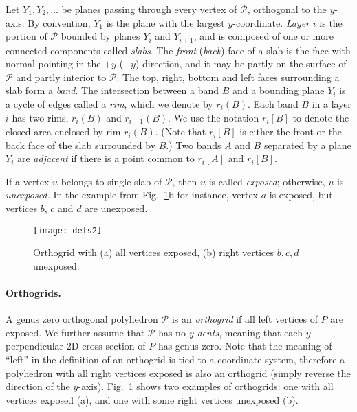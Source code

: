\documentclass[11pt]{article}
\def\P{{\mathcal P}}
\begin{document}
Let $Y_1, Y_2, \ldots$ be planes passing through every vertex of $\P$,
orthogonal to the $y$-axis. By convention, $Y_1$ is the plane with the
largest $y$-coordinate.
\emph{Layer} $i$ is the portion of $\P$ bounded by planes $Y_i$
and $Y_{i+1}$, and is composed of one or more connected
components called \emph{slabs}.
The \emph{front} (\emph{back}) face of a slab is the face with normal pointing
in the $+y$ ($-y$) direction, and it may be partly on the surface of $\P$ and partly
interior to $\P$. The top, right, bottom and left faces surrounding a slab form
a \emph{band}. The intersection between a band
$B$ and a bounding plane $Y_i$ is a cycle of edges called a \emph{rim},
which we denote by $r_i(B)$.
Each band $B$ in a layer $i$ has two rims, $r_i(B)$ and $r_{i+1}(B)$.
We use the notation 
$r_i[B]$ to denote the closed area enclosed by rim $r_i(B)$. 
(Note that $r_i[B]$ is either the front or the back face of the slab surrounded by $B$.)
Two bands $A$ and $B$ separated by a plane $Y_i$ are \emph{adjacent} if there is a point common to $r_i[A]$ and $r_i[B]$.

If a vertex $u$ belongs to single slab of $\P$, then $u$ is called \emph{exposed}; otherwise, $u$ is \emph{unexposed.} In the example from Fig.~\ref{fig:defs2}b for instance, vertex $a$ is exposed, but vertices $b$, $c$ and $d$ are unexposed.
\begin{figure}[htbp]
\centering
\texttt{[image: defs2]}
\caption{Orthogrid with (a) all vertices exposed, (b) right vertices $b, c, d$ unexposed.}
\label{fig:defs2}
\end{figure}


\paragraph{Orthogrids.} A genus zero orthogonal polyhedron $\P$ is an \emph{orthogrid} if all left vertices of $P$ are exposed. We further assume that $\P$ has no \emph{y-dents}, meaning that each $y$-perpendicular 2D cross section of $P$ has genus zero. 
Note that the meaning of ``left'' in the definition of an orthogrid is tied to a coordinate system,  therefore a polyhedron with all right vertices exposed  is also an orthogrid (simply reverse the direction of the $y$-axis). Fig.~\ref{fig:defs2} shows two examples of orthogrids: one with all vertices exposed (a), and one with some right vertices unexposed (b). 
\end{document}
